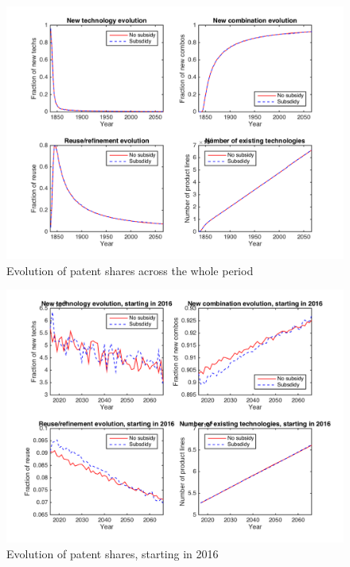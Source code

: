 \documentclass[a4paper,11pt]{article}
\theoremstyle{prop}
\theoremstyle{lemma}
\begin{document}
\begin{table}[h!]

\end{table}

\begin{figure}[h!]
\centering
\includegraphics[scale=.6]{patentsNC_50y}
\caption{Evolution of patent shares across the whole period}
\end{figure}

\begin{figure}
\centering
\includegraphics[scale=.6]{patents2016NC_50y}
\caption{Evolution of patent shares, starting in 2016}
\end{figure}
\end{document}
